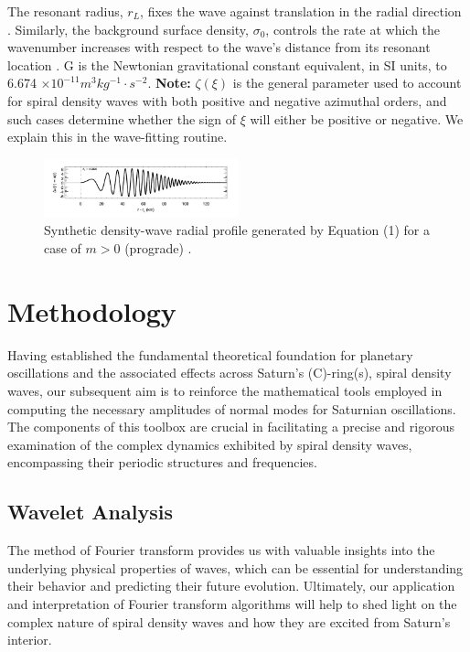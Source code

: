 \documentclass[conference]{IEEEtran}
\begin{document}
\vspace{3pt}

The resonant radius, $r_{L}$, fixes the wave against translation in the radial direction \cite{Tiscareno_2007}. Similarly, the background surface density, $\sigma_{0}$, controls the rate at which the wavenumber increases with respect to the wave's distance from its resonant location \cite{Tiscareno_2007}. G is the Newtonian gravitational constant equivalent, in SI units, to 6.674 $\times 10^{-11} m^{3}kg^{-1}⋅s^{-2}$.
\textbf{Note:} $\zeta(\xi)$ is the general parameter used to account for spiral density waves with both positive and negative azimuthal orders, and such cases determine whether the sign of $\xi$ will either be positive or negative. We explain this in the wave-fitting routine.

\begin{figure}[h] 
\centering 
\includegraphics[width=0.5\textwidth]{Linear_Density_WM.jpg}
\caption{Synthetic density-wave radial profile generated by Equation (1) for a case of $m>0$ (prograde) \cite{Tiscareno_2007}.} \label{fig:my_label}
\end{figure}


\section{Methodology}
Having established the fundamental theoretical foundation for planetary oscillations and the associated effects across Saturn's (C)-ring(s), spiral density waves, our subsequent aim is to reinforce the mathematical tools employed in computing the necessary amplitudes of normal modes for Saturnian oscillations. The components of this toolbox are crucial in facilitating a precise and rigorous examination of the complex dynamics exhibited by spiral density waves, encompassing their periodic structures and frequencies.

\subsection{Wavelet Analysis}
 The method of Fourier transform provides us with valuable insights into the underlying physical properties of waves, which can be essential for understanding their behavior and predicting their future evolution. Ultimately, our application and interpretation of Fourier transform algorithms will help to shed light on the complex nature of spiral density waves and how they are excited from Saturn's interior.
 
\end{document}
